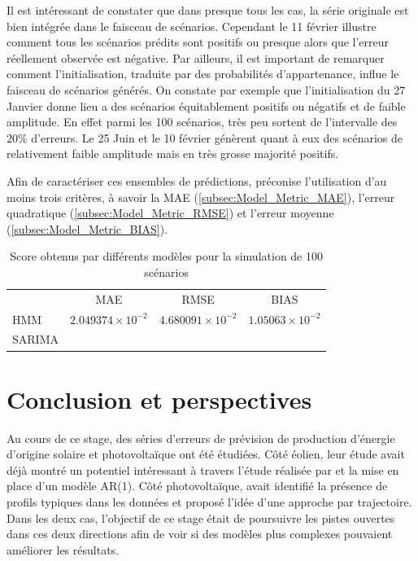 \documentclass[12pt, french]{report}
\begin{document}
Il est intéressant de constater que dans presque tous les cas, la série originale est bien intégrée dans le faisceau de scénarios. Cependant le 11 février illustre comment tous les scénarios prédits sont positifs ou presque alors que l'erreur réellement observée est négative. Par ailleurs, il est important de remarquer comment l'initialisation, traduite par des probabilités d'appartenance, influe le faisceau de scénarios générés. On constate par exemple que l'initialisation du 27 Janvier donne lieu a des scénarios équitablement positifs ou négatifs et de faible amplitude. En effet parmi les 100 scénarios, très peu sortent de l'intervalle des $20\%$ d'erreurs. Le 25 Juin et le 10 février génèrent quant à eux des scénarios de relativement faible amplitude mais en très grosse majorité positifs.

Afin de caractériser ces ensembles de prédictions, \cite{madsen_protocol_nodate} préconise l'utilisation d'au moins trois critères, à savoir la MAE (\ref{subsec:Model_Metric_MAE}), l'erreur quadratique (\ref{subsec:Model_Metric_RMSE}) et l'erreur moyenne (\ref{subsec:Model_Metric_BIAS}).


\begin{table}[h]
\centering
\caption{Score obtenus par différents modèles pour la simulation de 100 scénarios}
\begin{tabular}{lccc}
	& MAE  & RMSE & BIAS \\
HMM	& $2.049374 \times 10^{-2}$ & $4.680091\times 10^{-2}$ & $1.05063 \times 10^{-2}$	    \\
SARIMA	&  &  & 
\end{tabular}
\end{table}

   

\chapter{Conclusion et perspectives}
Au cours de ce stage, des séries d'erreurs de prévision de production d'énergie d'origine solaire et photovoltaïque ont été étudiées. Côté éolien, leur étude avait déjà montré un potentiel intéressant à travers l'étude réalisée par \cite{haessig_dimensionnement_2014} et la mise en place d'un modèle AR(1). Côté photovoltaïque, \cite{latimier_gestion_2016} avait identifié la présence de profils typiques dans les données et proposé l'idée d'une approche par trajectoire. Dans les deux cas, l'objectif de ce stage était de poursuivre les pistes ouvertes dans ces deux directions afin de voir si des modèles plus complexes pouvaient améliorer les résultats.
\end{document}

